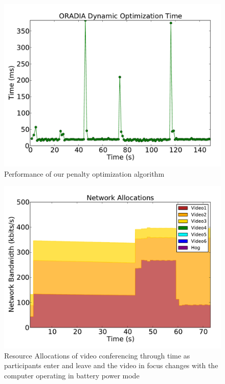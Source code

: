 \begin{figure}[!t]
	\begin{center}	
		\includegraphics[bb=0 0 576 432,width=\columnwidth]{opt_time-2vid.pdf}
		\caption{Performance of our penalty optimization algorithm}
		\label{optimization_perf_2vid}
	\end{center}
\end{figure}

\begin{figure}[!t]
	\begin{center}	
		\includegraphics[width=\columnwidth]{dyn-alloc-battery-ns-2vid.pdf}
		\caption{Resource Allocations of video conferencing through time as participants enter and leave and the video in focus changes with the computer operating in battery power mode}
		\label{video_experiment_battery_2vid}
	\end{center}
\end{figure}


